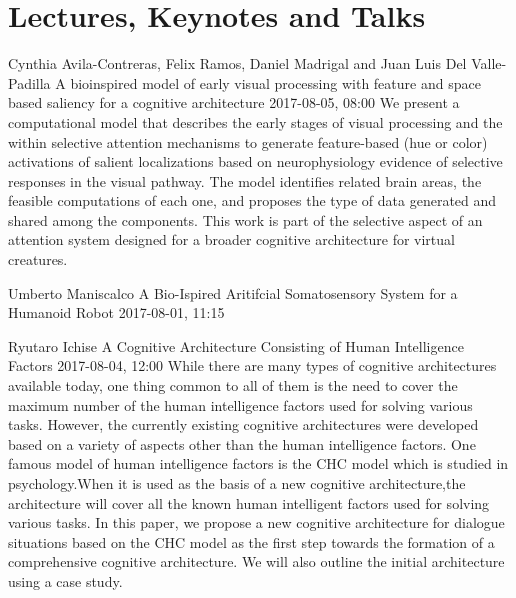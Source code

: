 \documentclass[10pt,fleqn,openany]{book} %
\begin{document}


\chapter{Lectures, Keynotes and Talks}

\begin{enumerate}
	
	
	\paperabstract
	{Cynthia Avila-Contreras, Felix Ramos, Daniel Madrigal and Juan Luis Del Valle-Padilla}
	{A bioinspired model of early visual processing with feature and space based saliency for a cognitive architecture}
	{2017-08-05, 08:00}
	{We present a computational model that describes the early stages of visual processing and the within selective attention mechanisms to generate feature-based (hue or color) activations of salient localizations based on neurophysiology evidence of selective responses in the visual pathway. The model identifies related brain areas, the feasible computations of each one, and proposes the type of data generated and shared among the components. This work is part of the selective aspect of an attention system designed for a broader cognitive architecture for virtual creatures.}
	
	
	\paperabstract
	{Umberto Maniscalco}
	{A Bio-Ispired Aritifcial Somatosensory System for a Humanoid Robot}
	{2017-08-01, 11:15}
	{}
	
	
	\paperabstract
	{Ryutaro Ichise}
	{A Cognitive Architecture Consisting of Human Intelligence Factors}
	{2017-08-04, 12:00}
	{While there are many types of cognitive architectures available today, one thing common to all of them is the need to cover the maximum number of the human intelligence factors used for solving various tasks. However, the currently existing cognitive architectures were developed based on a variety of aspects other than the human intelligence factors. One famous model of human intelligence factors is the CHC model which is studied in psychology.When it is used as the basis of a new cognitive architecture,the architecture will cover all the known human intelligent factors used for solving various tasks. In this paper, we propose a new cognitive architecture for dialogue situations based on the CHC model as the first step towards the formation of a comprehensive cognitive architecture. We will also outline the initial architecture using a case study.}
	

\end{enumerate}
\end{document}
